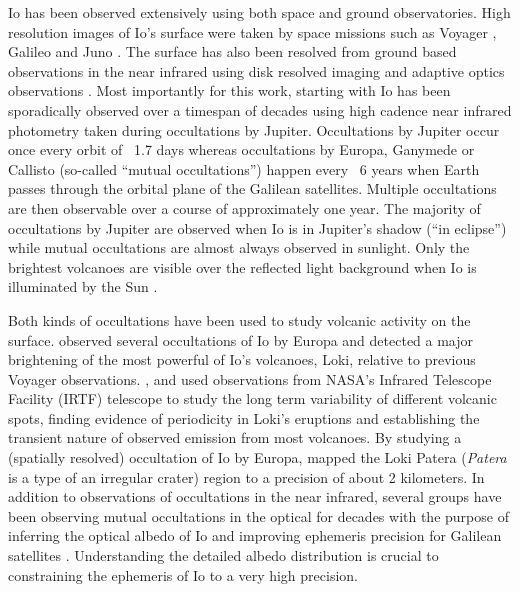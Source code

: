 \documentclass[linenumbers,modern]{aastex62}
\begin{document}
Io has been observed extensively using both space and ground observatories.
High resolution images of Io's surface were taken by space missions such as Voyager \citep{smith1979}, Galileo \citep{belton1996} and Juno \citep{mura2020}.
The surface has also been resolved from ground based observations in the near infrared using disk resolved imaging \citep{howell1985,simonelli1986,spencer1990} and adaptive optics observations \citep{marchis2000,marchis2005,dekleer2016}.
Most importantly for this work,  starting with \cite{spencer1990} Io has been sporadically observed over a timespan of decades using high cadence near infrared photometry taken during occultations by Jupiter.
Occultations by Jupiter occur once every orbit of ~1.7 days whereas occultations by Europa, Ganymede or Callisto (so-called ``mutual occultations'') happen every ~6 years when Earth passes through the orbital plane of the Galilean satellites.
Multiple occultations are then observable over a course of approximately one year.
The majority of occultations by Jupiter are observed when Io is in Jupiter's shadow (``in eclipse'') while mutual occultations are almost always observed in sunlight.
Only the brightest volcanoes are visible over the reflected light background when Io is illuminated by the Sun \citep{veeder1994,dekleer2016a}.

Both kinds of occultations have been used to study volcanic activity on the surface.
\cite{spencer1994} observed several occultations of Io by Europa and detected a major brightening of the most powerful of Io's volcanoes, Loki, relative to previous Voyager observations.
\cite{rathbun2002},\citet{rathbun2006} and \citet{rathbun2010} used observations from NASA's 
Infrared Telescope Facility (IRTF) telescope to study the long term variability of different volcanic spots, finding evidence of periodicity in Loki's eruptions and establishing the transient nature of observed emission from most volcanoes. 
By studying a (spatially resolved) occultation of Io by Europa, \cite{dekleer2017} mapped the Loki Patera (\emph{Patera} is a type of an irregular crater) region to a precision of about 2 kilometers.
In addition to observations of occultations in the near infrared, several groups have been observing mutual occultations in the optical for decades with the purpose of inferring the optical albedo of Io and improving ephemeris precision for Galilean satellites \citep[][and references therein]{arlot1974,lainey2009,saquet2018,morgado2016a}.
Understanding the detailed albedo distribution is crucial to constraining the ephemeris of Io to a very high precision.
\end{document}
